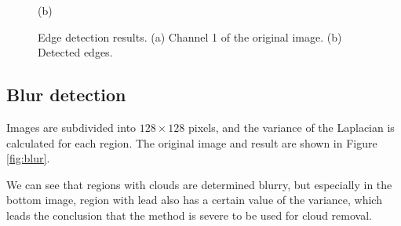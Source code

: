 \documentclass{article}
\begin{document}
\begin{figure}[ht]
\begin{minipage}{0.49\hsize}
                \caption*{(b)}
            \end{minipage}
            \caption{
                Edge detection results.
                (a) Channel 1 of the original image.
                (b) Detected edges.
            }
            \label{fig:edge}
        \end{figure}

    \subsection{Blur detection}
        Images are subdivided into $128 \times 128$ pixels,
        and the variance of the Laplacian is calculated for each region.
        The original image and result are shown in Figure \ref{fig:blur}.

        We can see that regions with clouds are determined blurry,
        but especially in the bottom image,
        region with lead also has a certain value of the variance,
        which leads the conclusion that the method is severe to be used for cloud removal.
\end{document}

